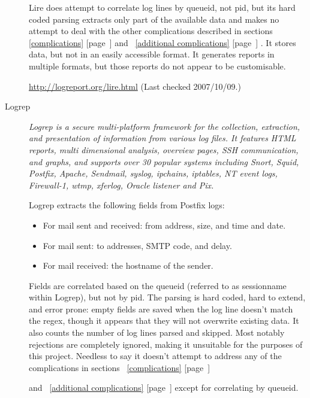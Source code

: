 \documentclass[a4paper,12pt,draft]{article}
\newcommand{\refwithpage}[1]{%
    \empty{}\ref{#1} [page~\pageref{#1}]%
}
\begin{document}
\begin{description}
        Lire does attempt to correlate log lines by queueid, not pid, but
        its hard coded parsing extracts only part of the available data and
        makes no attempt to deal with the other complications described in
        sections~\refwithpage{complications} and~\refwithpage{additional
        complications}.  It stores data, but not in an easily accessible
        format.  It generates reports in multiple formats, but those
        reports do not appear to be customisable.
        
        \url{http://logreport.org/lire.html} \newline (Last checked
        2007/10/09.)

    \item [Logrep] \textit{Logrep is a secure multi-platform framework for
        the collection, extraction, and presentation of information from
        various log files. It features HTML reports, multi dimensional
        analysis, overview pages, SSH communication, and graphs, and
        supports over 30 popular systems including Snort, Squid, Postfix,
        Apache, Sendmail, syslog, ipchains, iptables, NT event logs,
        Firewall-1, wtmp, xferlog, Oracle listener and Pix.\/}

        Logrep extracts the following fields from Postfix logs:

        \begin{itemize}

            \item For mail sent and received: from address, size, and time
                and date.

            \item For mail sent: to addresses, SMTP code, and delay.

            \item For mail received: the hostname of the sender.
                
        \end{itemize}
        
        Fields are correlated based on the queueid (referred to as
        sessionname within Logrep), but not by pid.  The parsing is hard
        coded, hard to extend, and error prone: empty fields are saved when
        the log line doesn't match the regex, though it appears that they
        will not overwrite existing data.  It also counts the number of log
        lines parsed and skipped.  Most notably rejections are completely
        ignored, making it unsuitable for the purposes of this project.
        Needless to say it doesn't attempt to address any of the
        complications in sections~\refwithpage{complications}
        and~\refwithpage{additional complications} except for correlating
        by queueid.


\end{description}
\end{document}
